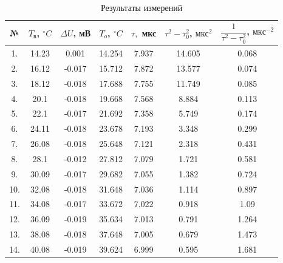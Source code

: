 \documentclass[12pt]{kiarticle} %
\begin{document}
\begin{table}[htbp]
	\centering
	\caption{Результаты измерений}

\begin{tabular}{|c|c|c|c|c|c|c|} 
	\hline 
	№ &  $ T_в $, $ ^\circ C $ &  $ \varDelta  U $, мВ & $ T_o $, $ ^\circ C$ & $ \tau, $ мкс & $ \tau^2 - \tau_0^2 $, $ мкс^2 $ & $ \dfrac{1}{\tau^2 - \tau_0^2} $, $ мкс^{-2} $  \\ 	\hline
	
 1. & 14.23 & 0.001 & 14.254 & 7.937 & 14.605 & 0.068 \\
2. & 16.12 & -0.017 & 15.712 & 7.872 & 13.577 & 0.074 \\
3. & 18.12 & -0.018 & 17.688 & 7.755 & 11.749 & 0.085 \\
4. & 20.1 & -0.018 & 19.668 & 7.568 & 8.884 & 0.113 \\
5. & 22.1 & -0.017 & 21.692 & 7.358 & 5.749 & 0.174 \\
6. & 24.11 & -0.018 & 23.678 & 7.193 & 3.348 & 0.299 \\
7. & 26.08 & -0.018 & 25.648 & 7.121 & 2.318 & 0.431 \\
8. & 28.1 & -0.012 & 27.812 & 7.079 & 1.721 & 0.581 \\
9. & 30.09 & -0.017 & 29.682 & 7.055 & 1.382 & 0.724 \\
10. & 32.08 & -0.018 & 31.648 & 7.036 & 1.114 & 0.897 \\
11. & 34.08 & -0.017 & 33.672 & 7.022 & 0.918 & 1.09 \\
12. & 36.09 & -0.019 & 35.634 & 7.013 & 0.791 & 1.264 \\
13. & 38.08 & -0.018 & 37.648 & 7.005 & 0.679 & 1.473 \\
14. & 40.08 & -0.019 & 39.624 & 6.999 & 0.595 & 1.681 \\
	\hline

\end{tabular}%
\label{res}%
\end{table}%
\end{document}
